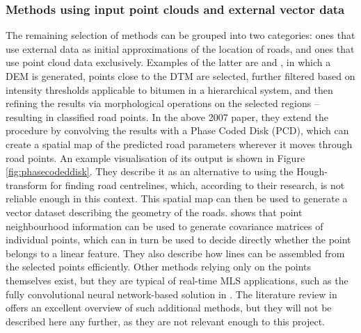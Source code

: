 \subsubsection*{Methods using input point clouds and external vector data}

The remaining selection of methods can be grouped into two categories: ones that use external data as initial approximations of the location of roads, and ones that use point cloud data exclusively.  Examples of the latter are \cite{clode_etal_2004} and \cite{clode_etal_2007}, in which a DEM is generated, points close to the DTM are selected, further filtered based on intensity thresholds applicable to bitumen in a hierarchical system, and then refining the results via morphological operations on the selected regions – resulting in classified road points. In the above 2007 paper, they extend the procedure by convolving the results with a Phase Coded Disk (PCD), which can create a spatial map of the predicted road parameters wherever it moves through road points. An example visualisation of its output is shown in Figure \ref{fig:phasecodeddisk}. They describe it as an alternative to using the Hough-transform for finding road centrelines, which, according to their research, is not reliable enough in this context. This spatial map can then be used to generate a vector dataset describing the geometry of the roads. \cite{gross_thoennessen_2006} shows that point neighbourhood information can be used to generate covariance matrices of individual points, which can in turn be used to decide directly whether the point belongs to a linear feature. They also describe how lines can be assembled from the selected points efficiently. Other methods relying only on the points themselves exist, but they are typical of real-time MLS applications, such as the fully convolutional neural network-based solution in \cite{caltagirone_etal_2017}. The literature review in \cite{yang_etal_2013} offers an excellent overview of such additional methods, but they will not be described here any further, as they are not relevant enough to this project.

